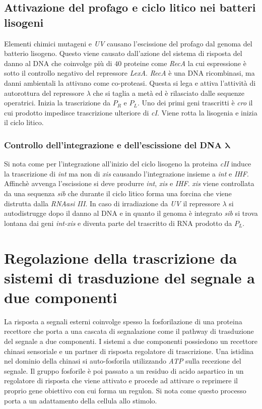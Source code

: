 \subsection{Attivazione del profago e ciclo litico nei batteri lisogeni}
Elementi chimici mutageni e \emph{UV} causano l'escissione del profago dal genoma del batterio lisogeno. Questo viene causato dall'azione del sistema di risposta del danno al DNA che
coinvolge pi\`u di $40$ proteine come \emph{RecA} la cui espressione \`e sotto il controllo negativo del repressore \emph{LexA}. \emph{RecA} \`e una DNA ricombinasi, ma danni ambientali
la attivano come co-proteasi. Questa si lega e attiva l'attivit\`a di autorottura del repressore $\lambda$ che si taglia a met\`a ed \`e rilasciato dalle sequenze operatrici. Inizia 
la trascrizione da $P_R$ e $P_L$. Uno dei primi geni trascritti \`e \emph{cro} il cui prodotto impedisce trascrizione ulteriore di \emph{cI}. Viene rotta la lisogenia e inizia il 
ciclo litico. 
\subsubsection{Controllo dell'integrazione e dell'escissione del DNA $\mathbf{\lambda}$}
Si nota come per l'integrazione all'inizio del ciclo lisogeno la proteina \emph{cII} induce la trascrizione di \emph{int} ma non di \emph{xis} causando l'integrazione insieme a
\emph{int} e \emph{IHF}. Affinch\`e avvenga l'escissione si deve produrre \emph{int}, \emph{xis} e \emph{IHF}. \emph{xis} viene controllata da una sequenza \emph{sib} che durante il 
ciclo litico forma una forcina che viene distrutta dalla \emph{RNAasi III}. In caso di irradiazione da \emph{UV} il repressore $\lambda$ si autodistrugge dopo il danno al DNA e in 
quanto il genoma \`e integrato \emph{sib} si trova lontana dai geni \emph{int-xis} e diventa parte del trascritto di RNA prodotto da $P_L$.
\section{Regolazione della trascrizione da sistemi di trasduzione del segnale a due componenti}
La risposta a segnali esterni coinvolge spesso la fosforilazione di una proteina recettore che porta a una cascata di segnalazione come il pathway di trasduzione del segnale a due 
componenti. I sistemi a due componenti possiedono un recettore chinasi sensoriale e un partner di risposta regolatore di trascrizione. Una istidina nel dominio della chinasi si 
auto-fosforila utilizzando \emph{ATP} sulla recezione del segnale. Il gruppo fosforile \`e poi passato a un residuo di acido aspartico in un regolatore di risposta che viene 
attivato e procede ad attivare o reprimere il proprio gene obiettivo con cui forma un regulon. Si nota come questo processo porta a un adattamento della cellula allo stimolo. 
